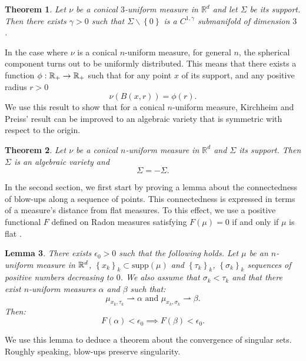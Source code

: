 \documentclass[11pt]{article}
\newtheorem{theorem}{Theorem}[section]
\newtheorem{lemma}[theorem]{Lemma}
\theoremstyle{definition}
\theoremstyle{remark}
\numberwithin{equation}{section}
\begin{document}
 \begin{theorem}\label{theorem1} Let $\nu$ be a conical $3$-uniform measure in $\mathbb{R}^d$ and let $\Sigma$ be its support. Then there exists $\gamma>0$ such that $\Sigma \backslash \left\lbrace 0 \right\rbrace$ is a $C^{1,\gamma}$ submanifold of dimension $3$ . \end{theorem}
 
 In the case where $\nu$ is a conical $n$-uniform measure, for general $n$, the spherical component turns out to be uniformly distributed.
 This means that there exists a function $\phi: \mathbb{R}_{+} \rightarrow \mathbb{R}_{+}$ such that for any point $x$ of its support, and any positive radius $r>0$ $$\nu(B(x,r))=\phi(r).$$
 We use this result to show that for a conical $n$-uniform measure, Kirchheim and Preiss' result can be improved to an algebraic variety that is symmetric with respect to the origin.
 
 \begin{theorem}\label{theorem2}
  Let $\nu$ be a conical $n$-uniform measure in $\mathbb{R}^d$ and $\Sigma$ its support. Then $\Sigma$ is an algebraic variety and \begin{equation}
 \Sigma=-\Sigma.
 \end{equation}
 \end{theorem}
 
 
 
 In the second section, we first start by proving a lemma about the connectedness of  blow-ups along a sequence of points.
 This connectedness is expressed in terms of a measure's distance from flat measures.
 To this effect, we use a positive functional  $F$ defined on Radon measures satisfying $F(\mu)=0$ if and only if $\mu$ is flat .
 \begin{lemma}
 There exists $\epsilon_{0}>0$ such that the following holds. Let $\mu$ be an $n$-uniform measure in $\mathbb{R}^{d}$, $\left\lbrace x_k \right\rbrace_{k} \subset \mbox{supp}(\mu)$ and $\left\lbrace \tau_{k} \right\rbrace_k$, $\left\lbrace \sigma_{k} \right\rbrace_{k}$ sequences of positive numbers decreasing to $0$.
We also assume that $\sigma_k < \tau_k$ and that there exist $n$-uniform measures $\alpha$ and $\beta$ such that:
$$\mu_{x_k,\tau_k} \rightharpoonup \alpha \mbox{ and } \mu_{x_k,\sigma_k} \rightharpoonup \beta.$$
Then:
$$F(\alpha) < \epsilon_{0} \implies F(\beta) < \epsilon_{0}.$$

 \end{lemma}
 
 We use this lemma to deduce a theorem about the convergence of singular sets. Roughly speaking, blow-ups preserve singularity.
 
\end{document}
